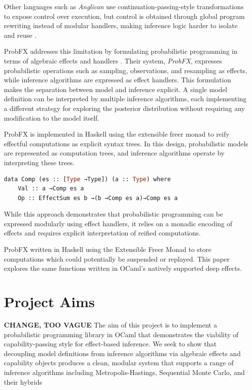 \documentclass[logo,bsc,singlespacing,parskip,online]{infthesis}
\begin{document}
Other languages such as \textit{Anglican} use continuation-passing-style transformations to expose control over execution, but control is obtained through global program rewriting instead of modular handlers, making inference logic harder to isolate and reuse \citep{Anglican}.


ProbFX addresses this limitation by formulating probabilistic programming in terms of algebraic effects and handlers \citep{ProbFX}. Their system, \textit{ProbFX}, expresses probabilistic operations such as sampling, observations, and resampling as effects, while inference algorithms are expressed as effect handlers. This formulation makes the separation between model and inference explicit. A single model definition can be interpreted by multiple inference algorithms, each implementing a different strategy for exploring the posterior distribution without requiring any modification to the model itself.


ProbFX is implemented in Haskell using the extensible freer monad to reify effectful computations as explicit syntax trees. In this design, probabilistic models are represented as computation trees, and inference algorithms operate by interpreting these trees. 

\begin{lstlisting}[language=OCaml]
data Comp (es :: [Type →Type]) (a :: Type) where
    Val :: a →Comp es a
    Op :: EffectSum es b →(b →Comp es a)→Comp es a
\end{lstlisting}



While this approach demonstrates that probabilistic programming can be expressed modularly using effect handlers, it relies on a monadic encoding of effects and requires explicit interpretation of reified computations.

ProbFX written in Haskell using the Extensible Freer Monad to store computations which could potentially be suspended or replayed. This paper explores the same functions written in OCaml's natively supported deep effects. 



\section{Project Aims}

\textbf{CHANGE, TOO VAGUE}
The aim of this project is to implement a probabilistic programming library in OCaml that demonstrates the viability of capability-passing style for effect-based inference. We seek to show that decoupling model definitions from inference algorithms via algebraic effects and capability objects produces a clean, modular system that supports a range of inference algorithms including Metropolis-Hastings, Sequential Monte Carlo, and their hybrids
\end{document}
